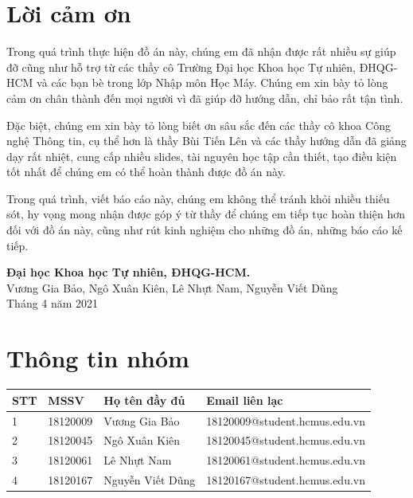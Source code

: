 \documentclass{article}
\newcommand\T{\rule{0pt}{2.6ex}}       %
\newcommand\B{\rule[-1.2ex]{0pt}{0pt}} %
\begin{document}
	\section*{Lời cảm ơn}
	\vspace{1.0in}
	\begingroup
	\setlength{\parindent}{0pt}
	\qquad Trong quá trình thực hiện đồ án này, chúng em đã nhận được rất nhiều sự giúp đỡ cũng như hỗ trợ từ các thầy cô Trường Đại học Khoa học Tự nhiên, ĐHQG-HCM và các bạn bè trong lớp Nhập môn Học Máy. Chúng em xin bày tỏ lòng cảm ơn chân thành đến mọi người vì đã giúp đỡ hướng dẫn, chỉ bảo rất tận tình.
	
	\qquad Đặc biệt, chúng em xin bày tỏ lòng biết ơn sâu sắc đến các thầy cô khoa Công nghệ Thông tin, cụ thể hơn là thầy Bùi Tiến Lên và các thầy hướng dẫn đã giảng dạy rất nhiệt, cung cấp nhiều slides, tài nguyên học tập cần thiết, tạo điều kiện tốt nhất để chúng em có thể hoàn thành được đồ án này.
	
	\qquad Trong quá trình, viết báo cáo này, chúng em không thể tránh khỏi nhiều thiếu sót, hy vọng mong nhận được góp ý từ thầy để chúng em tiếp tục hoàn thiện hơn đối với đồ án này, cũng như rút kinh nghiệm cho những đồ án, những báo cáo kế tiếp.
	
	\vspace{1.0in}
	\textbf{Đại học Khoa học Tự nhiên, ĐHQG-HCM.}\\
	Vương Gia Bảo, Ngô Xuân Kiên, Lê Nhựt Nam, Nguyễn Viết Dũng\\
	Tháng 4 năm 2021\\
	\endgroup
	
	\newpage
	\tableofcontents
	\newpage
	\setcounter{secnumdepth}{0}
	
	\section{Thông tin nhóm}
	\begin{center}
		\begin{tabular}{ | p{1cm} |  p{3cm} | p{5cm} | p{5cm}  |}\hline
			STT	& MSSV & Họ tên đầy đủ & Email liên lạc \T\B\\\hline
			1 & 18120009 & Vương Gia Bảo & 18120009@student.hcmus.edu.vn   \T\B\\ \hline
			2 & 18120045 & Ngô Xuân Kiên & 18120045@student.hcmus.edu.vn \T\B\\ \hline
			3 & 18120061 & Lê Nhựt Nam & 18120061@student.hcmus.edu.vn  \T\B\\ \hline
			4 & 18120167 & Nguyễn Viết Dũng &  18120167@student.hcmus.edu.vn \T\B\\ \hline
		\end{tabular}
	\end{center}
\end{document}

